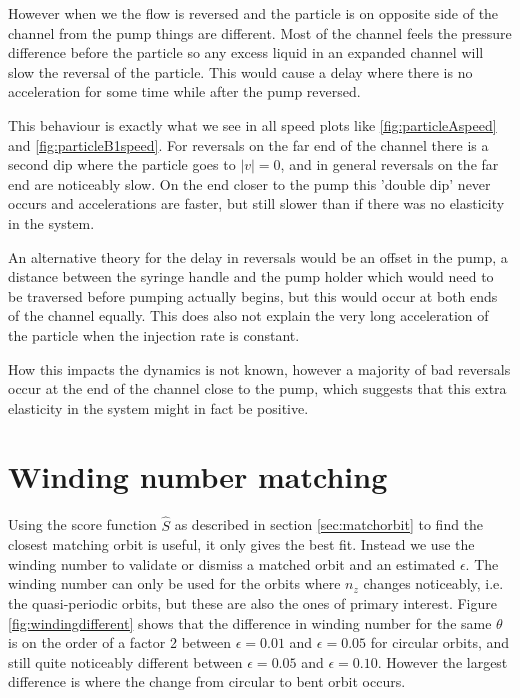 However when we the flow is reversed and the particle is on opposite side of the channel from the pump things are different. Most of the channel feels the pressure difference before the particle so any excess liquid in an expanded channel will slow the reversal of the particle. This would cause a delay where there is no acceleration for some time while after the pump reversed. 

This behaviour is exactly what we see in all speed plots like \ref{fig:particleAspeed} and \ref{fig:particleB1speed}. 
For reversals on the far end of the channel there is a second dip where the particle goes to $\left|v\right|=0$, and in general reversals on the far end are noticeably slow. On the end closer to the pump this 'double dip' never occurs and accelerations are faster, but still slower than if there was no elasticity in the system.

An alternative theory for the delay in reversals would be an offset in the pump, a distance between the syringe handle and the pump holder which would need to be traversed before pumping actually begins, but this would occur at both ends of the channel equally. This does also not explain the very long acceleration of the particle when the injection rate is constant.

How this impacts the dynamics is not known, however a majority of bad reversals occur at the end of the channel close to the pump, which suggests 
that this extra elasticity in the system might in fact be positive. 

\section{Winding number matching}
Using the score function $\hat{S}$ as described in section \ref{sec:matchorbit} to find the closest matching orbit is useful, it only gives the best fit.  Instead we use the winding number to validate or dismiss a matched orbit and an estimated $\epsilon$. The winding number can only be used for the orbits where $n_z$ changes noticeably, i.e. the quasi-periodic orbits, but these are also the ones of primary interest. 
Figure \ref{fig:windingdifferent} shows that the difference in winding number for the 
same $\theta$ is on the order of a factor 2 between $\epsilon = 0.01$ and $\epsilon = 0.05$ for circular orbits, and 
still quite noticeably different between $\epsilon = 0.05$ and $\epsilon = 0.10$. However the largest difference is where the change from 
circular to bent orbit occurs. 

